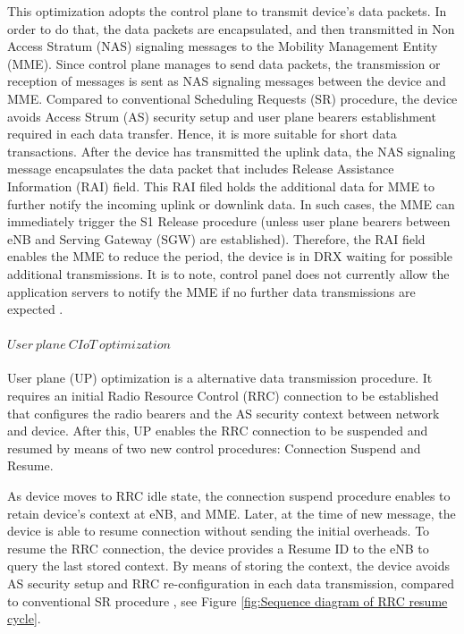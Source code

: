\documentclass[12pt]{article}
\begin{document}
This optimization adopts the control plane to transmit device's data packets. In order to do that, the data packets are encapsulated, and then transmitted in Non Access Stratum (NAS) signaling messages to the Mobility Management Entity (MME).
Since control plane manages to send data packets, the transmission or reception of messages is sent as NAS signaling messages between the device and MME. Compared to conventional Scheduling Requests (SR) procedure, the device avoids Access Strum (AS) security setup and user plane bearers establishment required in each data transfer. Hence, it is more suitable for short data transactions.
After the device has transmitted the uplink data, the NAS signaling message encapsulates the data packet that includes Release Assistance Information (RAI) field. This RAI filed holds the additional data for MME to further notify the incoming uplink or downlink data. In such cases, the MME can immediately trigger the S1 Release procedure (unless user plane bearers between eNB and Serving Gateway (SGW) are established). Therefore, the RAI field enables the MME to reduce the period, the device is in DRX waiting for possible additional transmissions. It is to note, control panel does not currently allow the application servers to notify the MME if no further data transmissions are expected \cite{andres2017narrowband}.\par

\paragraph{$User\  plane\  CIoT\  optimization$}
User plane (UP) optimization is a alternative data transmission procedure. It requires an initial Radio Resource Control (RRC) connection to be established that configures the radio bearers and the AS security context between network and device. After this, UP enables the RRC connection to be suspended and resumed by means of two new control procedures: Connection Suspend and Resume.\par
As device moves to RRC idle state, the connection suspend procedure enables to retain device's context at eNB, and MME. Later, at the time of new message, the device is able to resume connection without sending the initial overheads. To resume the RRC connection, the device provides a Resume ID to the eNB to query the last stored context. By means of storing the context, the device avoids AS security setup and RRC re-configuration in each data transmission, compared to conventional SR procedure \cite{farrell2018low,andres2017narrowband,popli2018survey}, see Figure \ref{fig:Sequence diagram of RRC resume cycle}.
\end{document}
